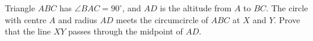 Triangle $ABC$ has $\angle BAC=90^\circ$, and $AD$ is the altitude from $A$ to $BC$. The circle with centre $A$ and radius $AD$ meets the circumcircle of $ABC$ at $X$ and $Y$. Prove that the line $XY$ passes through the midpoint of $AD$.

